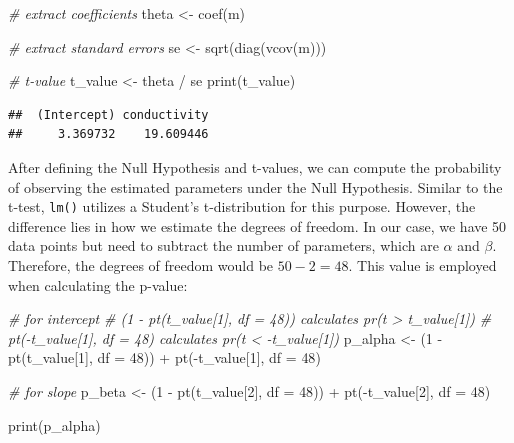 \documentclass[
]{article}
\newenvironment{Shaded}{\begin{snugshade}}{\end{snugshade}}
\newcommand{\AttributeTok}[1]{\textcolor[rgb]{0.77,0.63,0.00}{#1}}
\newcommand{\CommentTok}[1]{\textcolor[rgb]{0.56,0.35,0.01}{\textit{#1}}}
\newcommand{\DecValTok}[1]{\textcolor[rgb]{0.00,0.00,0.81}{#1}}
\newcommand{\FunctionTok}[1]{\textcolor[rgb]{0.00,0.00,0.00}{#1}}
\newcommand{\NormalTok}[1]{#1}
\newcommand{\OtherTok}[1]{\textcolor[rgb]{0.56,0.35,0.01}{#1}}
\newcommand{\SpecialCharTok}[1]{\textcolor[rgb]{0.00,0.00,0.00}{#1}}
\begin{document}
\begin{Shaded}
\begin{Highlighting}[]
\CommentTok{\# extract coefficients}
\NormalTok{theta }\OtherTok{\textless{}{-}} \FunctionTok{coef}\NormalTok{(m)}

\CommentTok{\# extract standard errors}
\NormalTok{se }\OtherTok{\textless{}{-}} \FunctionTok{sqrt}\NormalTok{(}\FunctionTok{diag}\NormalTok{(}\FunctionTok{vcov}\NormalTok{(m)))}

\CommentTok{\# t{-}value}
\NormalTok{t\_value }\OtherTok{\textless{}{-}}\NormalTok{ theta }\SpecialCharTok{/}\NormalTok{ se}
\FunctionTok{print}\NormalTok{(t\_value)}
\end{Highlighting}
\end{Shaded}

\begin{verbatim}
##  (Intercept) conductivity 
##     3.369732    19.609446
\end{verbatim}

After defining the Null Hypothesis and t-values, we can compute the probability of observing the estimated parameters under the Null Hypothesis. Similar to the t-test, \texttt{lm()} utilizes a Student's t-distribution for this purpose. However, the difference lies in how we estimate the degrees of freedom. In our case, we have 50 data points but need to subtract the number of parameters, which are \(\alpha\) and \(\beta\). Therefore, the degrees of freedom would be \(50 - 2 = 48\). This value is employed when calculating the p-value:

\begin{Shaded}
\begin{Highlighting}[]
\CommentTok{\# for intercept}
\CommentTok{\# (1 {-} pt(t\_value[1], df = 48)) calculates pr(t \textgreater{} t\_value[1])}
\CommentTok{\# pt({-}t\_value[1], df = 48) calculates pr(t \textless{} {-}t\_value[1])}
\NormalTok{p\_alpha }\OtherTok{\textless{}{-}}\NormalTok{ (}\DecValTok{1} \SpecialCharTok{{-}} \FunctionTok{pt}\NormalTok{(t\_value[}\DecValTok{1}\NormalTok{], }\AttributeTok{df =} \DecValTok{48}\NormalTok{)) }\SpecialCharTok{+} \FunctionTok{pt}\NormalTok{(}\SpecialCharTok{{-}}\NormalTok{t\_value[}\DecValTok{1}\NormalTok{], }\AttributeTok{df =} \DecValTok{48}\NormalTok{)}

\CommentTok{\# for slope}
\NormalTok{p\_beta }\OtherTok{\textless{}{-}}\NormalTok{ (}\DecValTok{1} \SpecialCharTok{{-}} \FunctionTok{pt}\NormalTok{(t\_value[}\DecValTok{2}\NormalTok{], }\AttributeTok{df =} \DecValTok{48}\NormalTok{)) }\SpecialCharTok{+} \FunctionTok{pt}\NormalTok{(}\SpecialCharTok{{-}}\NormalTok{t\_value[}\DecValTok{2}\NormalTok{], }\AttributeTok{df =} \DecValTok{48}\NormalTok{)}

\FunctionTok{print}\NormalTok{(p\_alpha)}
\end{Highlighting}
\end{Shaded}
\end{document}
